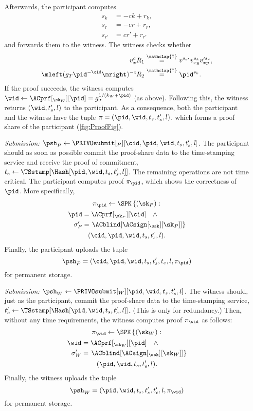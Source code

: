 Afterwards, the participant computes
\begin{align*}
s_k &= -ck + r_k, \\
s_r &= -cr + r_r, \\
s_{r'} &= cr' + r_{r'}
\end{align*}
and forwards them to the witness.
The witness checks whether
\begin{align*}
  v_x^c R_1 &\overset{\mathclap{?}}{=} v^{s_{r'}} v_{xy}^{s_k} v_{xy}^{\prime 
    s_r}, \\
  \mleft(g_T \pid^{-\cid}\mright)^{-c} R_2 &\overset{\mathclap{?}}{=} 
  \pid^{s_k}.
\end{align*}
If the proof succeeds, the witness computes \(\wid\gets \ACprf[_{\sk_W}][\pid] = g_T^{1/(k_W+\pid)}\) (as above).
Following this, the witness returns \((\wid, t_s', l)\) to the participant.
As a consequence, both the participant and the witness have the tuple \(\pi = (\pid, \wid, t_s, t_s', l)\), which forms a proof share of the participant (\cref{fig:ProofFig}).


\emph{Submission: \(\psh_P\gets \PRIVOsubmit[_P][\cid, \pid, \wid, t_s, t_s',  l]\).}
The participant should as soon as possible commit the proof-share data to the time-stamping service and receive the proof of commitment, \(t_e\gets 
  \TSstamp[\Hash[\pid, \wid, t_s, t_s', l]]\).
The remaining operations are not time critical.
The participant computes  proof \(\pi_{\pid}\), which shows the correctness of \(\pid\).
More specifically,
\begin{multline*}
  \pi_{\pid}\gets \SPK\left\{ (\sk_P) : \right. \\
    \begin{aligned}
      \pid &= \ACprf[_{\sk_P}][\cid] \quad \land \\
      \sigma_P' &= \left. \ACblind[\ACsign[_{\ssk}][\sk_P]] \right\}
    \end{aligned} \\
      (\cid, \pid, \wid, t_s, t_s', l).
\end{multline*}
Finally, the participant uploads the tuple \[  \psh_P = (\cid, \pid, \wid, t_s, t_s', t_e, l, \pi_{\pid})\] for permanent storage.

\emph{Submission: \(\psh_W\gets \PRIVOsubmit[_W][\pid, \wid, t_s, t_s', l]\).}
The witness should, just as the participant, commit the proof-share data to the time-stamping service, \(t_e'\gets \TSstamp[\Hash[\pid, \wid, t_s, t_s', l]]\).
(This is only for redundancy.)
Then, without any time requirements, the witness computes  proof 
\(\pi_{\wid}\) as follows:
\begin{multline*}
  \pi_{\wid}\gets \SPK\left\{ (\sk_W) : \right. \\
    \begin{aligned}
      \wid &= \ACprf[_{\sk_W}][\pid] \quad \land \\
      \sigma_W' &= \left. \ACblind[\ACsign[_{\ssk}][\sk_W]] \right\}
    \end{aligned} \\
      (\pid, \wid, t_s, t_s', l).
\end{multline*}
Finally, the witness uploads the tuple \[ \psh_W = (\pid, \wid, t_s, t_s', t_e', l, \pi_{\wid}) \] for permanent storage.

